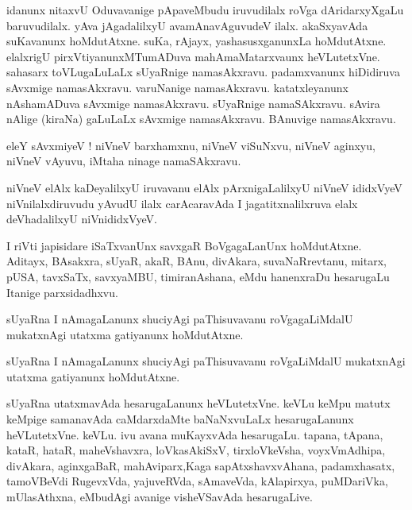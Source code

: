\documentclass{article}
\begin{document}
\begin{mng}%
idanunx nitaxvU Oduvavanige pApaveMbudu iruvudilalx roVga dAridarxyXgaLu baruvudilalx. yAva 
jAgadalilxyU avamAnavAguvudeV ilalx. akaSxyavAda suKavanunx hoMdutAtxne. suKa, rAjayx, 
yashasusxganunxLa hoMdutAtxne. elalxrigU pirxVtiyanunxMTumADuva mahAmaMatarxvaunx heVLutetxVne. 
sahasarx toVLugaLuLaLx sUyaRnige namasAkxravu. padamxvanunx hiDidiruva sAvxmige namasAkxravu. 
varuNanige namasAkxravu. katatxleyanunx nAshamADuva sAvxmige namasAkxravu. sUyaRnige 
namaSAkxravu. sAvira nAlige (kiraNa) gaLuLaLx sAvxmige namasAkxravu. BAnuvige namasAkxravu.
\end{mng}

\begin{mng}%
eleY sAvxmiyeV ! niVneV barxhamxnu, niVneV viSuNxvu, niVneV aginxyu, niVneV vAyuvu, iMtaha ninage 
namaSAkxravu.
\end{mng}

\begin{mng}%
niVneV elAlx kaDeyalilxyU iruvavanu elAlx pArxnigaLalilxyU niVneV ididxVyeV niVnilalxdiruvudu 
yAvudU ilalx carAcaravAda I jagatitxnalilxruva elalx deVhadalilxyU niVnididxVyeV.
\end{mng}

\begin{mng}%
I riVti japisidare iSaTxvanUnx savxgaR BoVgagaLanUnx hoMdutAtxne. Aditayx, BAsakxra, sUyaR, akaR, 
BAnu, divAkara, suvaNaRrevtanu, mitarx, pUSA, tavxSaTx, savxyaMBU, timiranAshana, eMdu hanenxraDu 
hesarugaLu Itanige parxsidadhxvu.
\end{mng}

\begin{mng}%
sUyaRna I nAmagaLanunx shuciyAgi paThisuvavanu roVgagaLiMdalU mukatxnAgi utatxma gatiyanunx 
hoMdutAtxne.
\end{mng}

\begin{mng}%
sUyaRna I nAmagaLanunx shuciyAgi paThisuvavanu roVgaLiMdalU mukatxnAgi utatxma gatiyanunx 
hoMdutAtxne.
\end{mng}

\begin{mng}%
sUyaRna utatxmavAda hesarugaLanunx heVLutetxVne. keVLu keMpu matutx keMpige samanavAda 
caMdarxdaMte baNaNxvuLaLx hesarugaLanunx heVLutetxVne. keVLu. ivu avana muKayxvAda hesarugaLu. 
tapana, tApana, kataR, hataR, maheVshavxra, loVkasAkiSxV, tirxloVkeVsha, voyxVmAdhipa, divAkara, 
aginxgaBaR, mahAviparx,Kaga sapAtxshavxvAhana, padamxhasatx, tamoVBeVdi RugevxVda, yajuveRVda, 
sAmaveVda, kAlapirxya, puMDariVka, mUlasAthxna, eMbudAgi avanige visheVSavAda hesarugaLive.
\end{mng}
\end{document}
